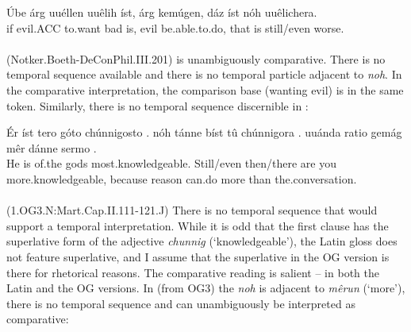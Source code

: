 \documentclass[output=paper,
modfonts
]{langscibook}
\begin{document}
\ea\gll Úbe árg uuéllen uuêlih íst, árg kemúgen, dáz íst nóh uuêlichera.\\
       if evil.ACC to.want bad is, evil be.able.to.do, that is still/even worse.\\%
\label{OG3_noch_schlimmer} \\  (Notker.Boeth-DeConPhil.III.201)
\z
{} is unambiguously comparative. There is no temporal sequence available and there is no temporal particle adjacent to \textit{noh}. In the comparative interpretation, the comparison base (wanting evil) is in the same token. Similarly, there is no temporal sequence discernible in :

\ea\gll Ér íst tero góto {chúnnigosto .} nóh tánne bíst tû {chúnnigora .} uuánda ratio gemág mêr dánne {sermo .}\\
       He is of.the gods most.knowledgeable. Still/even then/there are you more.knowledgeable, because reason can.do more than the.conversation.\\
\label{OG3_noch_wissend} \\ (1.OG3.N:Mart.Cap.II.111-121.J)
\z
There is no temporal sequence that would support a temporal interpretation. While it is odd that the first clause has the superlative form of the adjective \textit{chunnig} (`knowledgeable'), the Latin gloss does not feature superlative, and I assume that the superlative in the OG version is there for rhetorical reasons. The comparative reading is salient -- in both the Latin and the OG versions. In  (from OG3) the \textit{noh} is adjacent to \textit{mêrun} (`more'), there is no temporal sequence and  can unambiguously be interpreted as comparative:
\end{document}

